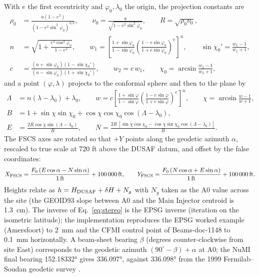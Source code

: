 \documentclass[11pt,letterpaper]{article}
\begin{document}
With $e$ the first eccentricity and $\varphi_0,\lambda_0$ the origin, the projection constants are
\begin{equation}
\begin{aligned}
\rho_0&=\frac{a(1-e^2)}{(1-e^2\sin^2\varphi_0)^{3/2}},\qquad \nu_0=\frac{a}{\sqrt{1-e^2\sin^2\varphi_0}},\qquad R=\sqrt{\rho_0\nu_0},\\
n&=\sqrt{1+\frac{e^2\cos^4\varphi_0}{1-e^2}},\qquad
w_1=\left[\frac{1+\sin\varphi_0}{1-\sin\varphi_0}\left(\frac{1-e\sin\varphi_0}{1+e\sin\varphi_0}\right)^{e}\right]^{n},\qquad
\sin\chi_0'=\frac{w_1-1}{w_1+1},\\
c&=\frac{(n+\sin\varphi_0)(1-\sin\chi_0')}{(n-\sin\varphi_0)(1+\sin\chi_0')},\qquad w_2=c\,w_1,\qquad \chi_0=\arcsin\frac{w_2-1}{w_2+1},
\end{aligned}
\end{equation}
and a point $(\varphi,\lambda)$ projects to the conformal sphere and then to the plane by
\begin{equation}
\begin{aligned}
\Lambda&=n(\lambda-\lambda_0)+\lambda_0,\qquad
w=c\left[\frac{1+\sin\varphi}{1-\sin\varphi}\left(\frac{1-e\sin\varphi}{1+e\sin\varphi}\right)^{e}\right]^{n},\qquad
\chi=\arcsin\frac{w-1}{w+1},\\
B&=1+\sin\chi\sin\chi_0+\cos\chi\cos\chi_0\cos(\Lambda-\lambda_0),\\
E&=\frac{2R\cos\chi\sin(\Lambda-\lambda_0)}{B},\qquad
N=\frac{2R\,[\sin\chi\cos\chi_0-\cos\chi\sin\chi_0\cos(\Lambda-\lambda_0)]}{B}.
\end{aligned}
\label{eq:stereo}
\end{equation}
The FSCS axes are rotated so that $+Y$ points along the geodetic azimuth $\alpha$, rescaled to true scale at 720 ft above the DUSAF datum, and offset by the false coordinates:
\begin{equation}
X_{\rm FSCS}=\frac{F_0\,(E\cos\alpha-N\sin\alpha)}{\SI{1}{ft}}+\SI{100000}{ft},\qquad
Y_{\rm FSCS}=\frac{F_0\,(N\cos\alpha+E\sin\alpha)}{\SI{1}{ft}}+\SI{100000}{ft}.
\label{eq:fscsrot}
\end{equation}
Heights relate as $h=H_{\rm DUSAF}+\delta H+N_g$ with $N_g$ taken as the A0 value across the site (the GEOID93 slope between A0 and the Main Injector centroid is \SI{1.3}{cm}).  The inverse of Eq.~\eqref{eq:stereo} is the EPSG inverse (iteration on the isometric latitude); the implementation reproduces the EPSG worked example (Amersfoort) to \SI{2}{mm} and the CFMI control point of Beams-doc-1148 to \SI{0.1}{mm} horizontally.  A beam-sheet bearing $\beta$ (degrees counter-clockwise from site East) corresponds to the geodetic azimuth $(90^{\circ}-\beta)+\alpha$ at A0; the NuMI final bearing \ang{152.18332} gives \ang{336.097}, against \ang{336.098} from the 1999 Fermilab--Soudan geodetic survey \cite{bocean1999,soler2000}.
\end{document}

